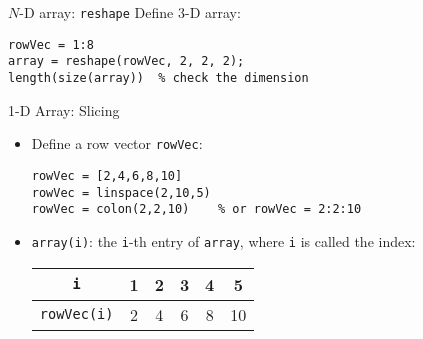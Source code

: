 \begin{frame}[fragile]{\(N\)-D array: \texttt{reshape}}
\protect\hypertarget{n-d-array-reshape}{}
Define 3-D array:

\begin{verbatim}
rowVec = 1:8
array = reshape(rowVec, 2, 2, 2);
length(size(array))  % check the dimension
\end{verbatim}
\end{frame}

\begin{frame}[fragile]{1-D Array: Slicing}
\protect\hypertarget{d-array-slicing}{}
\begin{itemize}[<+->]
\item
  Define a row vector \texttt{rowVec}:

\begin{verbatim}
rowVec = [2,4,6,8,10]
rowVec = linspace(2,10,5)
rowVec = colon(2,2,10)    % or rowVec = 2:2:10
\end{verbatim}
\item
  \texttt{array(i)}: the \texttt{i}-th entry of \texttt{array}, where
  \texttt{i} is called the index:

  \begin{table}[!hbtp]
    \centering
    \begin{tabular}{cccccc}
      \toprule
      \verb|i|         & 1 & 2 & 3 & 4 & 5 \\
      \midrule
      \verb|rowVec(i)| & 2 & 4 & 6 & 8 & 10 \\
      \bottomrule
    \end{tabular}
  \end{table}
\end{itemize}
\end{frame}

